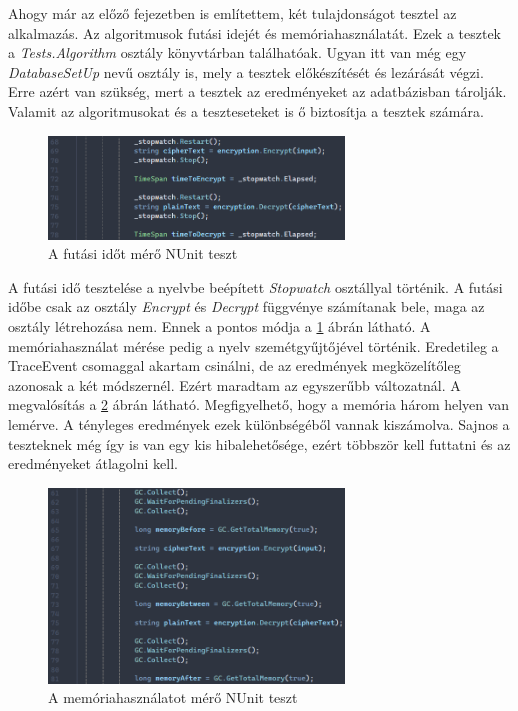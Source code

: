 \documentclass[12pt]{report} %
\begin{document}
Ahogy már az előző fejezetben is említettem, két tulajdonságot tesztel az alkalmazás. Az algoritmusok futási idejét és memóriahasználatát. Ezek a tesztek a \textit{Tests.Algorithm} osztály könyvtárban találhatóak. Ugyan itt van még egy \textit{DatabaseSetUp} nevű osztály is, mely a tesztek előkészítését és lezárását végzi. Erre azért van szükség, mert a tesztek az eredményeket az adatbázisban tárolják. Valamit az algoritmusokat és a teszteseteket is ő biztosítja a tesztek számára.

\begin{figure}[H]
    \centering %
    \includegraphics[width=0.7\textwidth]{Figures/Implementation4.png} %
    \caption{A futási időt mérő NUnit teszt} %
    \label{fig:Implementation4} %
\end{figure}

A futási idő tesztelése a nyelvbe beépített \textit{Stopwatch} osztállyal történik. A futási időbe csak az osztály \textit{Encrypt} és \textit{Decrypt} függvénye számítanak bele, maga az osztály létrehozása nem. Ennek a pontos módja a \ref{fig:Implementation4} ábrán látható. A memóriahasználat mérése pedig a nyelv szemétgyűjtőjével történik. Eredetileg a TraceEvent csomaggal akartam csinálni, de az eredmények megközelítőleg azonosak a két módszernél. Ezért maradtam az egyszerűbb változatnál. A megvalósítás a \ref{fig:Implementation5} ábrán látható. Megfigyelhető, hogy a memória három helyen van lemérve. A tényleges eredmények ezek különbségéből vannak kiszámolva. Sajnos a teszteknek még így is van egy kis hibalehetősége, ezért többször kell futtatni és az eredményeket átlagolni kell.

\begin{figure}[H]
    \centering %
    \includegraphics[width=0.7\textwidth]{Figures/Implementation5.png} %
    \caption{A memóriahasználatot mérő NUnit teszt} %
    \label{fig:Implementation5} %
\end{figure}
\end{document}
